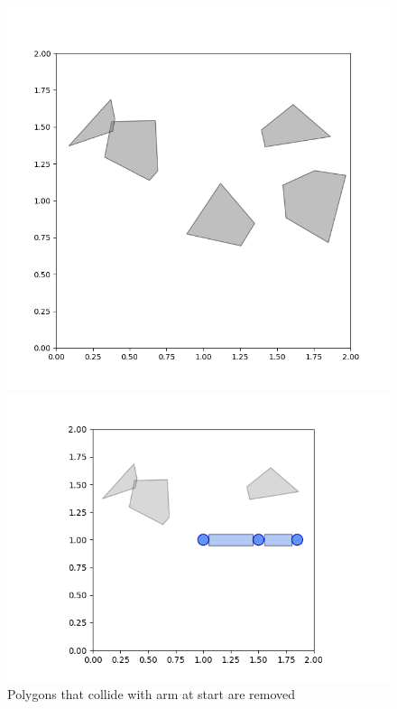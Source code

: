 \documentclass{article}
\begin{document}
\begin{figure}[H]
  \centering
  \begin{minipage}{0.45\textwidth}
    \includegraphics[scale = 0.3]{part4_visualization.png}
  \end{minipage}\hfill
  \begin{minipage}{0.45\textwidth}
    \includegraphics[width=\linewidth]{part4_visualization_arm.png}
  \end{minipage}
    \caption{Polygons that collide with arm at start are removed}
\end{figure}
\end{document}
